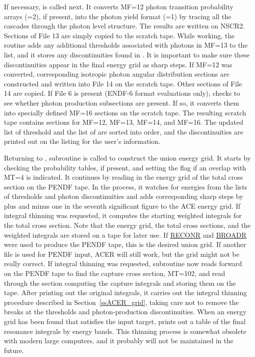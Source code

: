 If necessary, 
is called next.  It converts MF=12 photon transition probability
arrays (=2), if present, into the photon yield
format (=1) by tracing all the cascades through
the photon level structure.  The results are written on NSCR2.
Sections of File 13 are simply copied to the scratch tape.  While
working, the routine adds any additional thresholds associated with
photons in MF=13 to the  list, and it stores any
discontinuities found in .  It is important to make
sure these discontinuities appear in the final energy grid as sharp
steps.  If MF=12 was converted, corresponding isotropic photon angular
distribution sections are constructed and written into File 14 on the
scratch tape.  Other sections of File 14 are copied.  If File 6 is
present (ENDF-6 format evaluations only),  checks to see
whether photon production subsections are present.  If so, it converts
them into specially defined MF=16 sections on the scratch tape.  The
resulting scratch tape contains sections for MF=12, MF=13, MF=14,
and MF=16.  The updated list of threshold and the list of
are sorted into order, and the discontinuities are printed out on
the listing for the user's information.

Returning to , subroutine
 is called
to construct the union energy grid.  It starts by checking the
probability tables, if present, and setting the flag 
if an overlap with MT=4 is indicated.  It continues by reading in
the energy grid of the total cross section on the PENDF tape.  In
the process, it watches for energies from the lists of thresholds
and photon discontinuities and adds corresponding sharp steps by
plus and minus one in the seventh significant figure to the
ACE energy grid.  If integral thinning was requested, it computes
the starting weighted integrals for the total cross section.  Note
that the energy grid, the total cross sections, and the weighted
integrals are stored on a  tape for later
use.  If \hyperlink{sRECONRhy}{RECONR} and
\hyperlink{sBROADRhy}{BROADR} were used to
produce the PENDF tape, this
is the desired union grid.  If another file is used for PENDF input,
ACER will still work, but the grid might not be really correct.
If integral thinning was requested, subroutine  now
reads forward on the PENDF tape to find the capture cross section,
MT=102, and read through the section computing the capture integrals
and storing them on the  tape.  After printing
out the original integrals,  it carries out the integral thinning
procedure described in Section~\ref{ssACER_grid}, taking care not to remove the
breaks at the thresholds and photon-production discontinuities.  When
an energy grid has been found that satisfies the input target,
 prints out a table of the final resonance integrals
by energy bands.  This thinning process is somewhat obsolete with
modern large computers, and it probably will not be maintained in
the future.

